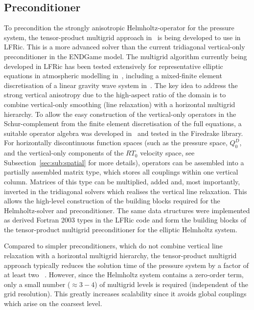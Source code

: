 \documentclass[review,times]{elsarticle}
\begin{document}
\subsection{\label{sec:sub:preconditioner}Preconditioner}

To precondition the strongly anisotropic Helmholtz-operator for the
pressure system, the tensor-product multigrid approach in~\cite{Borm2001} 
is being developed to use in LFRic. This is a more advanced solver than
the current tridiagonal vertical-only preconditioner in the ENDGame
model. The multigrid algorithm currently being developed in LFRic has been tested
extensively for representative elliptic equations in atmospheric
modelling in~\cite{Mueller2014,Dedner2016}, including a mixed-finite
element discretisation of a linear gravity wave system in~\cite{Mitchell2016}. 
The key idea to address the strong vertical
anisotropy due to the high-aspect ratio of the domain is to combine
vertical-only smoothing (line relaxation) with a horizontal multigrid
hierarchy. To allow the easy construction of the vertical-only
operators in the Schur-complement from the finite element
discretisation of the full equations, a suitable operator algebra was
developed in~\cite{Mitchell2016} and tested in the Firedrake
library. For horizontally discontinuous function spaces (such as the
pressure space, $Q_0^D$, and the vertical-only components of the $RT_0$ 
velocity space, see Subsection~\ref{sec:sub:spatial} for more details), 
operators can be assembled into a partially assembled matrix type, which 
stores all couplings within one vertical column. Matrices of this type can be
multiplied, added and, most importantly, inverted in the tridiagonal
solvers which realises the vertical line relaxation. This allows the
high-level construction of the building blocks required for the
Helmholtz-solver and preconditioner. The same data structures were
implemented as derived Fortran 2003 types in the LFRic code and form
the building blocks of the tensor-product multigrid preconditioner for
the elliptic Helmholtz system.


Compared to simpler preconditioners, which do not combine vertical
line relaxation with a horizontal multigrid hierarchy, the
tensor-product multigrid approach typically reduces the solution time
of the pressure system by a factor of at least two
~\cite{Mueller2014,Mitchell2016}. However, since the Helmholtz system
contains a zero-order term, only a small number ($\approx 3-4$) of
multigrid levels is required (independent of the grid
resolution). This greatly increases scalability since it avoids global
couplings which arise on the coarsest level.
\end{document}
